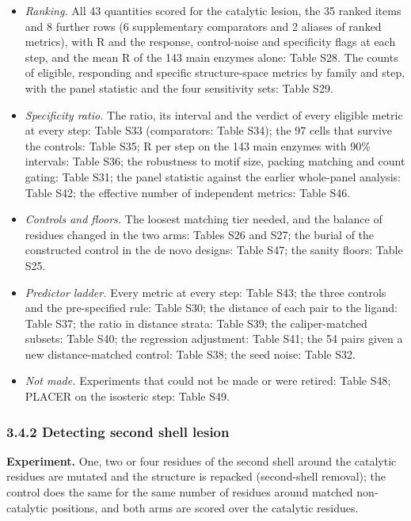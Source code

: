 \documentclass[
  10pt,
]{article}
\providecommand{\tightlist}{%
  \setlength{\itemsep}{0pt}\setlength{\parskip}{0pt}}
\DeclareRobustCommand{\_}{\textunderscore\hspace{0pt}}
\begin{document}
\begin{itemize}
\tightlist
\item
  \emph{Ranking.}
  All 43 quantities
  scored for the
  catalytic lesion,
  the 35 ranked
  items and 8
  further rows (6
  supplementary
  comparators and 2
  aliases of ranked
  metrics), with R
  and the response,
  control-noise and
  specificity flags
  at each step, and
  the mean R of the
  143 main enzymes
  alone: Table S28.
  The counts of
  eligible,
  responding and
  specific
  structure-space
  metrics by family
  and step, with the
  panel statistic
  and the four
  sensitivity sets:
  Table S29.
\item
  \emph{Specificity
  ratio.} The ratio,
  its interval and
  the verdict of
  every eligible
  metric at every
  step: Table S33
  (comparators:
  Table S34); the 97
  cells that survive
  the controls:
  Table S35; R per
  step on the 143
  main enzymes with
  90\% intervals:
  Table S36; the
  robustness to
  motif size,
  packing matching
  and count gating:
  Table S31; the
  panel statistic
  against the
  earlier
  whole-panel
  analysis: Table
  S42; the effective
  number of
  independent
  metrics: Table
  S46.
\item
  \emph{Controls and
  floors.} The
  loosest matching
  tier needed, and
  the balance of
  residues changed
  in the two arms:
  Tables S26 and
  S27; the burial of
  the constructed
  control in the de
  novo designs:
  Table S47; the
  sanity floors:
  Table S25.
\item
  \emph{Predictor
  ladder.} Every
  metric at every
  step: Table S43;
  the three controls
  and the
  pre-specified
  rule: Table S30;
  the distance of
  each pair to the
  ligand: Table S37;
  the ratio in
  distance strata:
  Table S39; the
  caliper-matched
  subsets: Table
  S40; the
  regression
  adjustment: Table
  S41; the 54 pairs
  given a new
  distance-matched
  control: Table
  S38; the seed
  noise: Table S32.
\item
  \emph{Not made.}
  Experiments that
  could not be made
  or were retired:
  Table S48; PLACER
  on the isosteric
  step: Table S49.
\end{itemize}

\subsubsection{3.4.2
Detecting second
shell lesion}

\textbf{Experiment.}
One, two or four
residues of the
second shell around
the catalytic
residues are mutated
and the structure is
repacked
(second-shell
removal); the
control does the
same for the same
number of residues
around matched
non-catalytic
positions, and both
arms are scored over
the catalytic
residues.
\end{document}
